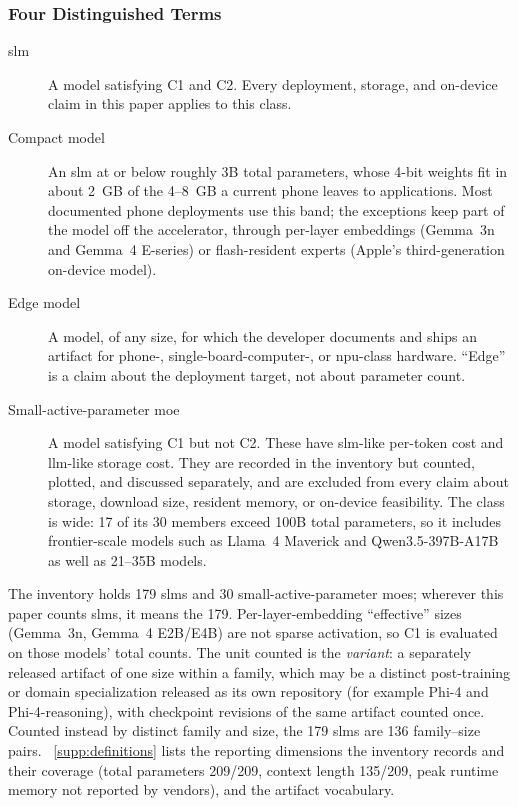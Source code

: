 \subsubsection{Four Distinguished Terms}
\label{subsubsec:intro_def_terms}

\begin{description}
  \item[\gls{slm}] A model satisfying C1 and C2. Every deployment, storage, and on-device claim in this paper applies to this class.
  \item[Compact model] An \gls{slm} at or below roughly 3B total parameters, whose 4-bit weights fit in about 2~GB of the 4--8~GB a current phone leaves to applications. Most documented phone deployments use this band; the exceptions keep part of the model off the accelerator, through per-layer embeddings (Gemma~3n and Gemma~4 E-series) or flash-resident experts (Apple's third-generation on-device model).
  \item[Edge model] A model, of any size, for which the developer documents and ships an artifact for phone-, single-board-computer-, or \gls{npu}-class hardware. ``Edge'' is a claim about the deployment target, not about parameter count.
  \item[Small-active-parameter \gls{moe}] A model satisfying C1 but not C2. These have \gls{slm}-like per-token cost and \gls{llm}-like storage cost. They are recorded in the inventory but counted, plotted, and discussed separately, and are excluded from every claim about storage, download size, resident memory, or on-device feasibility. The class is wide: 17 of its 30 members exceed 100B total parameters, so it includes frontier-scale models such as Llama~4 Maverick and Qwen3.5-397B-A17B as well as 21--35B models.
\end{description}

The inventory holds 179 \glspl{slm} and 30 small-active-parameter \glspl{moe}; wherever this paper counts \glspl{slm}, it means the 179. Per-layer-embedding ``effective'' sizes (Gemma~3n, Gemma~4 E2B/E4B) are not sparse activation, so C1 is evaluated on those models' total counts. The unit counted is the \emph{variant}: a separately released artifact of one size within a family, which may be a distinct post-training or domain specialization released as its own repository (for example Phi-4 and Phi-4-reasoning), with checkpoint revisions of the same artifact counted once. Counted instead by distinct family and size, the 179 \glspl{slm} are 136 family--size pairs. \suppsec~\ref{supp:definitions} lists the reporting dimensions the inventory records and their coverage (total parameters 209/209, context length 135/209, peak runtime memory not reported by vendors), and the artifact vocabulary.

